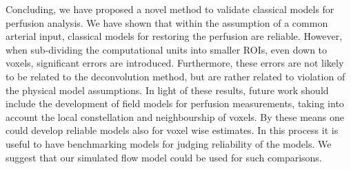 \documentclass[paper=a4, fontsize=11pt,parskip=half,headings=small]{scrartcl}
\begin{document}
	Concluding, we have proposed a novel method to validate classical models for perfusion analysis. We have shown that within the assumption of a common arterial input, classical models for restoring the perfusion are reliable. However, when sub-dividing the computational units into smaller ROIs, even down to voxels, significant errors are introduced. Furthermore, these errors are not likely to be related to the deconvolution method, but are rather related to violation of the physical model assumptions. In light of these results, future work should include the development of field models for perfusion measurements, taking into account the local constellation and neighbourship of voxels. By these means one could develop reliable models also for voxel wise estimates. In this process it is useful to have benchmarking models for judging reliability of the models. We suggest that our simulated flow model could be used for such comparisons.
	 
%	

	
		
	

	
\end{document}
